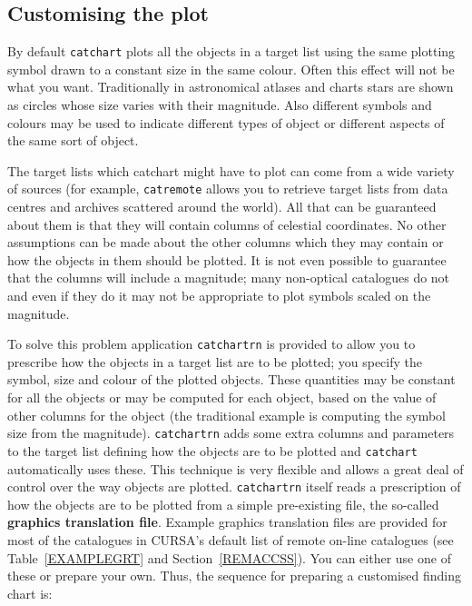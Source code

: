 \documentclass[twoside,11pt]{starlink}
\begin{document}
\subsection{\label{GRT}Customising the plot}

By default \texttt{catchart} plots all the objects in a target list using
the same plotting symbol drawn to a constant size in the same colour.
Often this effect will not be what you want.  Traditionally in
astronomical atlases and charts stars are shown as circles whose
size varies with their magnitude.  Also different symbols and colours
may be used to indicate different types of object or different aspects
of the same sort of object.

The target lists which {catchart} might have to plot can come from a wide
variety of sources (for example, \texttt{catremote} allows you to retrieve
target lists from data centres and archives scattered around the
world).  All that can be guaranteed about them is that they
will contain columns of celestial coordinates.  No other assumptions
can be made about the other columns which they may contain or how the
objects in them should be plotted.  It is not even possible to guarantee
that the columns will include a magnitude; many non-optical catalogues
do not and even if they do it may not be appropriate to plot symbols
scaled on the magnitude.

To solve this problem application \texttt{catchartrn} is provided to allow
you to prescribe how the objects in a target list are to be plotted; you
specify the symbol, size and colour of the plotted objects.  These
quantities may be constant for all the objects or may be computed for
each object, based on the value of other columns for the object (the
traditional example is computing the symbol size from the magnitude).
\texttt{catchartrn} adds some extra columns and parameters to the target list
defining how the objects are to be plotted and \texttt{catchart}
automatically uses these.  This technique is very flexible and allows a
great deal of control over the way objects are plotted.  \texttt{catchartrn} itself reads a prescription of how the objects are to be
plotted from a simple pre-existing file, the so-called \textbf{graphics
translation file}.  Example graphics translation files are provided for
most of the catalogues in CURSA's default list of remote on-line
catalogues (see Table~\ref{EXAMPLEGRT} and Section~\ref{REMACCSS}).
You can either use one of these or prepare your own.  Thus, the sequence
for preparing a customised finding chart is:
\end{document}
